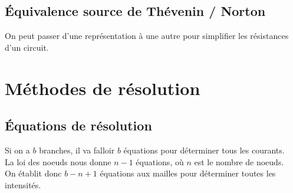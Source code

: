 \documentclass[13pt, twoside, a4paper, french]{report}
\begin{document}
    \subsection{Équivalence source de Thévenin / Norton}\label{subsec:equivalence-source-de-thevenin-/-norton}

    \begin{figure}[!htb]
    \end{figure}

    On peut passer d'une représentation à une autre pour simplifier les résistances d'un circuit.\\


    \section{Méthodes de résolution}\label{sec:methodes-de-resolution}

    \subsection{Équations de résolution}\label{subsec:equations-de-resolution}

    Si on a $b$ branches, il va falloir $b$ équations pour déterminer tous les courants.\\
    La loi des noeuds nous donne $n-1$ équations, où $n$ est le nombre de noeuds.\\
    On établit donc $b - n + 1$ équations aux mailles pour déterminer toutes les intensités.
\end{document}
